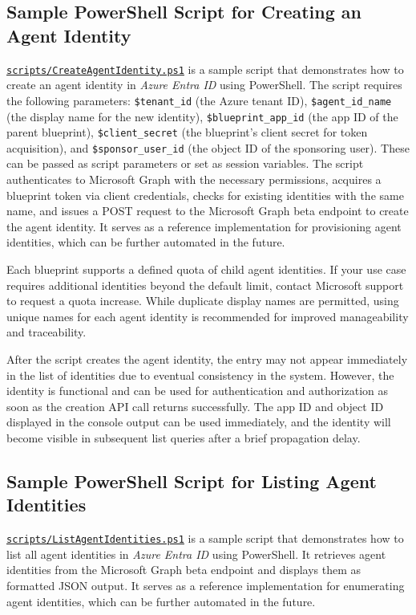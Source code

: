 \documentclass[9pt]{extarticle}%
\begin{document}
\subsection{Sample PowerShell Script for Creating an Agent Identity}%
\href{https://github.com/dennisseah/agent-identity/blob/main/scripts/CreateAgentIdentity.ps1}{\texttt{scripts/CreateAgentIdentity.ps1}} is a sample script that demonstrates how to create an agent identity in \textit{Azure Entra ID} using PowerShell. The script requires the following parameters: \texttt{\$tenant\_id} (the Azure tenant ID), \texttt{\$agent\_id\_name} (the display name for the new identity), \texttt{\$blueprint\_app\_id} (the app ID of the parent blueprint), \texttt{\$client\_secret} (the blueprint's client secret for token acquisition), and \texttt{\$sponsor\_user\_id} (the object ID of the sponsoring user). These can be passed as script parameters or set as session variables. The script authenticates to Microsoft Graph with the necessary permissions, acquires a blueprint token via client credentials, checks for existing identities with the same name, and issues a POST request to the Microsoft Graph beta endpoint to create the agent identity. It serves as a reference implementation for provisioning agent identities, which can be further automated in the future.
%
\par\vspace{\baselineskip}%
Each blueprint supports a defined quota of child agent identities. If your use case requires additional identities beyond the default limit, contact Microsoft support to request a quota increase. While duplicate display names are permitted, using unique names for each agent identity is recommended for improved manageability and traceability.
%
\par\vspace{\baselineskip}%
After the script creates the agent identity, the entry may not appear immediately in the list of identities due to eventual consistency in the system. However, the identity is functional and can be used for authentication and authorization as soon as the creation API call returns successfully. The app ID and object ID displayed in the console output can be used immediately, and the identity will become visible in subsequent list queries after a brief propagation delay.
%
\par\vspace{\baselineskip}%
\subsection{Sample PowerShell Script for Listing Agent Identities}%
\href{https://github.com/dennisseah/agent-identity/blob/main/scripts/ListAgentIdentities.ps1}{\texttt{scripts/ListAgentIdentities.ps1}} is a sample script that demonstrates how to list all agent identities in \textit{Azure Entra ID} using PowerShell. It retrieves agent identities from the Microsoft Graph beta endpoint and displays them as formatted JSON output. It serves as a reference implementation for enumerating agent identities, which can be further automated in the future.
%
\par\vspace{\baselineskip}%
\end{document}
